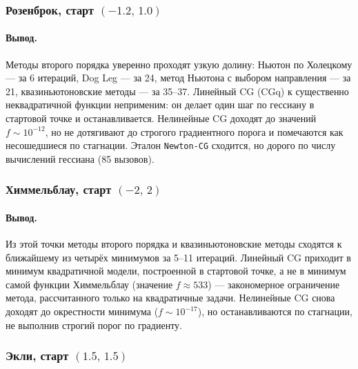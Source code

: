 \documentclass[a4paper,12pt]{article}
\theoremstyle{definition}
\begin{document}
\subsubsection{\texorpdfstring{Розенброк, старт $(-1.2,\,1.0)$}{Розенброк, старт (-1.2, 1.0)}}



\paragraph{Вывод.}
Методы второго порядка уверенно проходят узкую долину: Ньютон по Холецкому — за 6 итераций,
Dog Leg — за 24, метод Ньютона с выбором направления — за 21, квазиньютоновские методы — за
35--37. Линейный CG (CGq) к существенно неквадратичной функции неприменим: он делает один шаг по
гессиану в стартовой точке и останавливается. Нелинейные CG доходят до значений
$f \sim 10^{-12}$, но не дотягивают до строгого градиентного порога и помечаются как несошедшиеся
по стагнации. Эталон \verb|Newton-CG| сходится, но дорого по числу вычислений гессиана (85 вызовов).

\subsubsection{\texorpdfstring{Химмельблау, старт $(-2,\,2)$}{Химмельблау, старт (-2, 2)}}



\paragraph{Вывод.}
Из этой точки методы второго порядка и квазиньютоновские методы сходятся к ближайшему из четырёх
минимумов за 5--11 итераций. Линейный CG приходит в минимум квадратичной модели,
построенной в стартовой точке, а не в минимум самой функции Химмельблау (значение
$f \approx 533$) — закономерное ограничение метода, рассчитанного только на квадратичные задачи.
Нелинейные CG снова доходят до окрестности минимума ($f \sim 10^{-17}$), но останавливаются по
стагнации, не выполнив строгий порог по градиенту.

\subsubsection{\texorpdfstring{Экли, старт $(1.5,\,1.5)$}{Экли, старт (1.5, 1.5)}}


\end{document}
